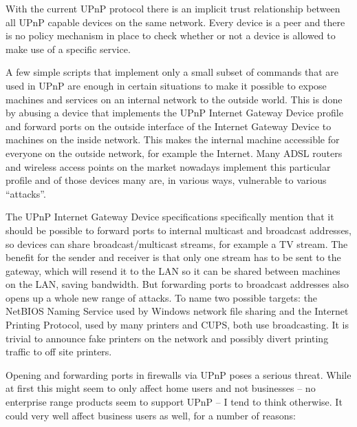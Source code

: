 \documentclass[10pt]{article}
\begin{document}
With the current UPnP protocol there is an implicit trust relationship
between all UPnP capable devices on the same network. Every device is a peer
and there is no policy mechanism in place to check whether or not a device is
allowed to make use of a specific service.

A few simple scripts that implement only a small subset of commands that are
used in UPnP are enough in certain situations to make it possible to expose
machines and services on an internal network to the outside world. This is
done by abusing a device that implements the UPnP Internet Gateway Device
profile and forward ports on the outside interface of the Internet Gateway
Device to machines on the inside network. This makes the internal machine
accessible for everyone on the outside network, for example the Internet.
Many ADSL routers and wireless access points on the market nowadays implement
this particular profile and of those devices many are, in various ways,
vulnerable to various ``attacks''.

The UPnP Internet Gateway Device specifications specifically mention that
it should be possible to forward ports to internal multicast and broadcast
addresses, so devices can share broadcast/multicast streams, for example a
TV stream. The benefit for the sender and receiver is that only one stream
has to be sent to the gateway, which will resend it to the LAN so it can be
shared between machines on the LAN, saving bandwidth. But forwarding ports
to broadcast addresses also opens up a whole new range of attacks. To name
two possible targets: the NetBIOS Naming Service used by Windows network file
sharing and the Internet Printing Protocol, used by many printers and CUPS,
both use broadcasting. It is trivial to announce fake printers on the network
and possibly divert printing traffic to off site printers.

Opening and forwarding ports in firewalls via UPnP poses a serious threat.
While at first this might seem to only affect home users and not businesses
-- no enterprise range products seem to support UPnP -- I tend to think
otherwise. It could very well affect business users as well, for a number of
reasons:
\end{document}
